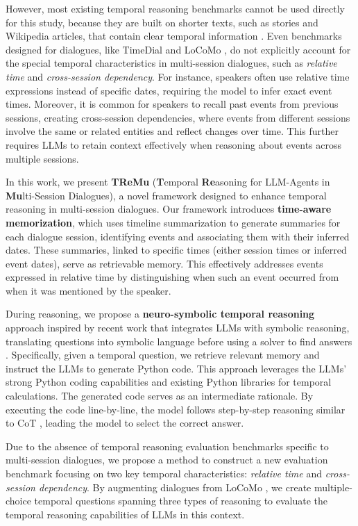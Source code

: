 However, most existing temporal reasoning benchmarks cannot be used directly for this study, because they are built on shorter texts, such as stories and Wikipedia articles, that contain clear temporal information \cite{chen2dataset,wang-zhao-2024-tram,xiong-etal-2024-large}. Even benchmarks designed for dialogues, like TimeDial \cite{qin2021timedial} and LoCoMo \cite{maharana-etal-2024-evaluating}, do not explicitly account for the special temporal characteristics in multi-session dialogues, such as \textit{relative time} and \textit{cross-session dependency}. For instance, speakers often use relative time expressions instead of specific dates, requiring the model to infer exact event times. Moreover, it is common for speakers to recall past events from previous sessions, creating cross-session dependencies, where events from different sessions involve the same or related entities and reflect changes over time. This further requires LLMs to retain context effectively when reasoning about events across multiple sessions.


In this work, we present \textbf{TReMu} (\textbf{T}emporal \textbf{Re}asoning for LLM-Agents in \textbf{Mu}lti-Session Dialogues), a novel framework designed to enhance temporal reasoning in multi-session dialogues. Our framework introduces \textbf{time-aware memorization}, which uses timeline summarization to generate summaries for each dialogue session, identifying events and associating them with their inferred dates. These summaries, linked to specific times (either session times or inferred event dates), serve as retrievable memory. This effectively addresses events expressed in relative time by distinguishing when such an event occurred from when it was mentioned by the speaker.

During reasoning, we propose a \textbf{neuro-symbolic temporal reasoning} approach inspired by recent work that integrates LLMs with symbolic reasoning, translating questions into symbolic language before using a solver to find answers \cite{pan2023logic,olausson2023linc}. Specifically, given a temporal question, we retrieve relevant memory and instruct the LLMs to generate Python code. This approach leverages the LLMs' strong Python coding capabilities and existing Python libraries for temporal calculations. The generated code serves as an intermediate rationale. By executing the code line-by-line, the model follows step-by-step reasoning similar to CoT \cite{wei2022chain}, leading the model to select the correct answer.

Due to the absence of temporal reasoning evaluation benchmarks specific to multi-session dialogues, we propose a method to construct a new evaluation benchmark focusing on two key temporal characteristics: \textit{relative time} and \textit{cross-session dependency}. By augmenting dialogues from LoCoMo \cite{maharana-etal-2024-evaluating}, we create multiple-choice temporal questions spanning three types of reasoning to evaluate the temporal reasoning capabilities of LLMs in this context.

